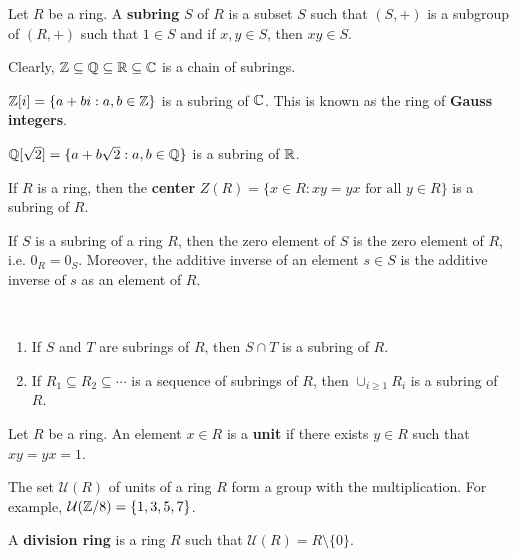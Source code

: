 \begin{definition}
    Let $R$ be a ring. A \textbf{subring} $S$ of $R$ is a subset $S$ such that
    $(S,+)$ is a subgroup of $(R,+)$ such that $1\in S$ and 
    if $x,y\in S$, then $xy\in S$. 
\end{definition}

Clearly, $\mathbb{Z}\subseteq\mathbb{Q}\subseteq\mathbb{R}\subseteq\mathbb{C}$ is a chain of subrings. 

\begin{example}
    $\mathbb{Z}[i]=\{a+bi:a,b\in\mathbb{Z}\}$ is a subring of $\mathbb{C}$. 
    This is known as the ring of \textbf{Gauss integers}.  
\end{example}

\begin{example}
    $\mathbb{Q}[\sqrt{2}]=\{a+b\sqrt{2}:a,b\in\mathbb{Q}\}$ is a subring of $\mathbb{R}$. 
\end{example}

\begin{example}
    If $R$ is a ring, then the \textbf{center} 
    $Z(R)=\{x\in R:xy=yx\text{ for all $y\in R$}\}$ 
    is a subring of $R$. 
\end{example}

If $S$ is a subring of a ring $R$, then the zero element 
of $S$ is the zero element of $R$, i.e. $0_R=0_S$. Moreover, 
the additive inverse of an element $s\in S$ 
is the additive inverse of $s$ as an element of $R$. 	

\begin{exercise}\
\begin{enumerate}
	\item If $S$ and $T$ are subrings of $R$, then $S\cap T$ is a subring of $R$.
	\item If $R_1\subseteq R_2\subseteq\cdots$ is a sequence of subrings of $R$, then 
	$\cup_{i\geq1}R_i$ is a subring of $R$. 
\end{enumerate}
\end{exercise}

\begin{definition}
	Let $R$ be a ring. An element $x\in R$ is 
	a \textbf{unit} if there exists $y\in R$ such that $xy=yx=1$. 
\end{definition}

The set $\mathcal{U}(R)$ of units of a ring $R$ form 
a group with the multiplication. For example,
$\mathcal{U}(\mathbb{Z}/8)=\{1,3,5,7\}$. 

\begin{definition}
	A \textbf{division ring} is a ring $R$ 
	such that $\mathcal{U}(R)=R\setminus\{0\}$.  	
\end{definition}

